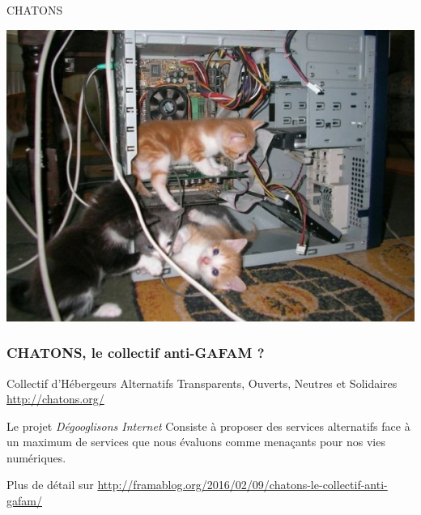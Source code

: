 \documentclass{beamer}
\begin{document}
\begin{frame}
\Huge{\centerline{CHATONS}}
\begin{center}
\includegraphics[scale=0.5]{./images/Cute-Kittens-In-Computer-Case.jpg}
\end{center}
\end{frame}

\begin{frame}
\frametitle{CHATONS, le collectif anti-GAFAM ?}
Collectif d'Hébergeurs Alternatifs Transparents, Ouverts, Neutres et Solidaires \url{http://chatons.org/}

\begin{block}{Le projet \emph{Dégooglisons Internet} }
Consiste à proposer des services alternatifs face à un maximum de services que nous évaluons comme menaçants pour nos vies numériques.
\end{block}
Plus de détail sur \url{http://framablog.org/2016/02/09/chatons-le-collectif-anti-gafam/}

\end{frame}
\end{document}
